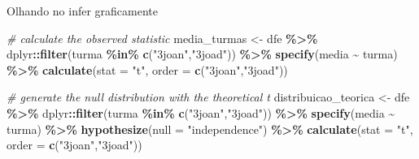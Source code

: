 \documentclass[
  9pt,
  ignorenonframetext,
  aspectratio=169]{beamer}
\newenvironment{Shaded}{\begin{snugshade}}{\end{snugshade}}
\newcommand{\CommentTok}[1]{\textcolor[rgb]{0.56,0.35,0.01}{\textit{#1}}}
\newcommand{\DataTypeTok}[1]{\textcolor[rgb]{0.13,0.29,0.53}{#1}}
\newcommand{\KeywordTok}[1]{\textcolor[rgb]{0.13,0.29,0.53}{\textbf{#1}}}
\newcommand{\NormalTok}[1]{#1}
\newcommand{\OperatorTok}[1]{\textcolor[rgb]{0.81,0.36,0.00}{\textbf{#1}}}
\newcommand{\StringTok}[1]{\textcolor[rgb]{0.31,0.60,0.02}{#1}}
\begin{document}
\begin{frame}[fragile]{Olhando no infer graficamente}
\protect\hypertarget{olhando-no-infer-graficamente}{}
\begin{Shaded}
\begin{Highlighting}[]
\CommentTok{\# calculate the observed statistic}
\NormalTok{media\_turmas \textless{}{-}}\StringTok{ }\NormalTok{dfe }\OperatorTok{\%\textgreater{}\%}\StringTok{ }
\StringTok{  }\NormalTok{dplyr}\OperatorTok{::}\KeywordTok{filter}\NormalTok{(turma }\OperatorTok{\%in\%}\StringTok{ }\KeywordTok{c}\NormalTok{(}\StringTok{"3joan"}\NormalTok{,}\StringTok{"3joad"}\NormalTok{)) }\OperatorTok{\%\textgreater{}\%}\StringTok{ }
\StringTok{  }\KeywordTok{specify}\NormalTok{(media }\OperatorTok{\textasciitilde{}}\StringTok{ }\NormalTok{turma) }\OperatorTok{\%\textgreater{}\%}
\StringTok{  }\KeywordTok{calculate}\NormalTok{(}\DataTypeTok{stat =} \StringTok{"t"}\NormalTok{, }\DataTypeTok{order =} \KeywordTok{c}\NormalTok{(}\StringTok{"3joan"}\NormalTok{,}\StringTok{"3joad"}\NormalTok{))}

\CommentTok{\# generate the null distribution with the theoretical t}
\NormalTok{distribuicao\_teorica \textless{}{-}}\StringTok{ }\NormalTok{dfe }\OperatorTok{\%\textgreater{}\%}\StringTok{ }
\StringTok{  }\NormalTok{dplyr}\OperatorTok{::}\KeywordTok{filter}\NormalTok{(turma }\OperatorTok{\%in\%}\StringTok{ }\KeywordTok{c}\NormalTok{(}\StringTok{"3joan"}\NormalTok{,}\StringTok{"3joad"}\NormalTok{)) }\OperatorTok{\%\textgreater{}\%}\StringTok{ }
\StringTok{  }\KeywordTok{specify}\NormalTok{(media }\OperatorTok{\textasciitilde{}}\StringTok{ }\NormalTok{turma) }\OperatorTok{\%\textgreater{}\%}
\StringTok{  }\KeywordTok{hypothesize}\NormalTok{(}\DataTypeTok{null =} \StringTok{"independence"}\NormalTok{) }\OperatorTok{\%\textgreater{}\%}
\StringTok{  }\KeywordTok{calculate}\NormalTok{(}\DataTypeTok{stat =} \StringTok{"t"}\NormalTok{, }\DataTypeTok{order =} \KeywordTok{c}\NormalTok{(}\StringTok{"3joan"}\NormalTok{,}\StringTok{"3joad"}\NormalTok{))}
\end{Highlighting}
\end{Shaded}
\end{frame}
\end{document}
